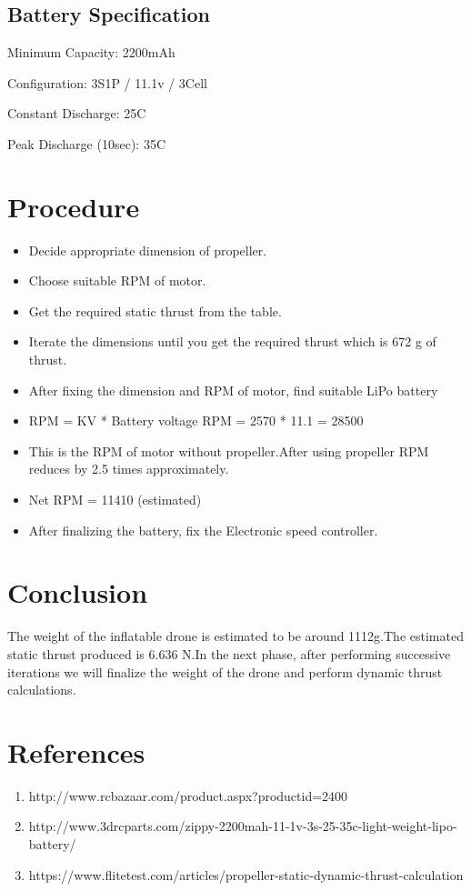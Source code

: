 \documentclass[8pt]{report}
\begin{document}
\subsection{Battery Specification}

Minimum Capacity: 2200mAh

Configuration: 3S1P / 11.1v / 3Cell

Constant Discharge: 25C

Peak Discharge (10sec): 35C
\section{Procedure}
\begin{itemize}

\item Decide appropriate dimension of propeller.
\item Choose suitable RPM of motor.
\item Get the required static thrust from the table.
\item Iterate the dimensions until you get the required thrust which is 672 g of thrust.
\item After fixing the dimension and RPM of motor, find suitable LiPo battery
\item RPM = KV * Battery voltage
RPM = 2570 * 11.1 = 28500
\item This is the RPM of motor without propeller.After using propeller RPM reduces by 2.5 times approximately.
\item Net RPM = 11410 (estimated)
\item After finalizing the battery, fix the Electronic speed controller.
\end{itemize}
  
\section{Conclusion} 
The weight of the inflatable drone is estimated to be around 1112g.The estimated static thrust produced is 6.636 N.In the next phase, after performing successive iterations we will finalize the weight of the drone and perform dynamic thrust calculations.

\section{References}
  
\begin{enumerate}

\item http://www.rcbazaar.com/product.aspx?productid=2400


\item http://www.3drcparts.com/zippy-2200mah-11-1v-3s-25-35c-light-weight-lipo-battery/


\item https://www.flitetest.com/articles/propeller-static-dynamic-thrust-calculation
\end{enumerate}
\end{document}
